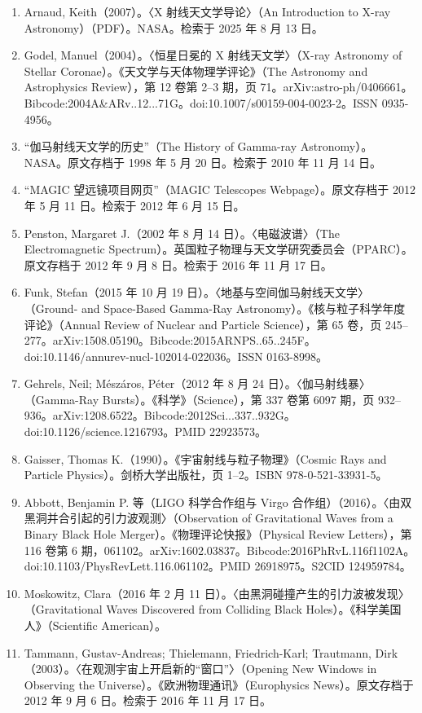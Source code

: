 \begin{enumerate}
  \item Arnaud, Keith（2007）。〈X 射线天文学导论〉（An Introduction to X-ray Astronomy）（PDF）。NASA。检索于 2025 年 8 月 13 日。
  \item Godel, Manuel（2004）。〈恒星日冕的 X 射线天文学〉（X-ray Astronomy of Stellar Coronae）。《天文学与天体物理学评论》（The Astronomy and Astrophysics Review），第 12 卷第 2–3 期，页 71。arXiv:astro-ph/0406661。Bibcode:2004A\&ARv..12...71G。doi:10.1007/s00159-004-0023-2。ISSN 0935-4956。
  \item “伽马射线天文学的历史”（The History of Gamma-ray Astronomy）。NASA。原文存档于 1998 年 5 月 20 日。检索于 2010 年 11 月 14 日。
  \item “MAGIC 望远镜项目网页”（MAGIC Telescopes Webpage）。原文存档于 2012 年 5 月 11 日。检索于 2012 年 6 月 15 日。
  \item Penston, Margaret J.（2002 年 8 月 14 日）。〈电磁波谱〉（The Electromagnetic Spectrum）。英国粒子物理与天文学研究委员会（PPARC）。原文存档于 2012 年 9 月 8 日。检索于 2016 年 11 月 17 日。
  \item Funk, Stefan（2015 年 10 月 19 日）。〈地基与空间伽马射线天文学〉（Ground- and Space-Based Gamma-Ray Astronomy）。《核与粒子科学年度评论》（Annual Review of Nuclear and Particle Science），第 65 卷，页 245–277。arXiv:1508.05190。Bibcode:2015ARNPS..65..245F。doi:10.1146/annurev-nucl-102014-022036。ISSN 0163-8998。
  \item Gehrels, Neil; Mészáros, Péter（2012 年 8 月 24 日）。〈伽马射线暴〉（Gamma-Ray Bursts）。《科学》（Science），第 337 卷第 6097 期，页 932–936。arXiv:1208.6522。Bibcode:2012Sci...337..932G。doi:10.1126/science.1216793。PMID 22923573。
  \item Gaisser, Thomas K.（1990）。《宇宙射线与粒子物理》（Cosmic Rays and Particle Physics）。剑桥大学出版社，页 1–2。ISBN 978-0-521-33931-5。
  \item Abbott, Benjamin P. 等（LIGO 科学合作组与 Virgo 合作组）（2016）。〈由双黑洞并合引起的引力波观测〉（Observation of Gravitational Waves from a Binary Black Hole Merger）。《物理评论快报》（Physical Review Letters），第 116 卷第 6 期，061102。arXiv:1602.03837。Bibcode:2016PhRvL.116f1102A。doi:10.1103/PhysRevLett.116.061102。PMID 26918975。S2CID 124959784。
  \item Moskowitz, Clara（2016 年 2 月 11 日）。〈由黑洞碰撞产生的引力波被发现〉（Gravitational Waves Discovered from Colliding Black Holes）。《科学美国人》（Scientific American）。
  \item Tammann, Gustav-Andreas; Thielemann, Friedrich-Karl; Trautmann, Dirk（2003）。〈在观测宇宙上开启新的“窗口”〉（Opening New Windows in Observing the Universe）。《欧洲物理通讯》（Europhysics News）。原文存档于 2012 年 9 月 6 日。检索于 2016 年 11 月 17 日。

\end{enumerate}

